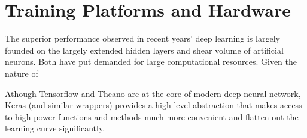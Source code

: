 \section{Training Platforms and Hardware}
The superior performance observed in recent years' deep learning is largely founded on the largely extended hidden layers and shear volume of artificial neurons. Both have put demanded for large computational resources. Given the nature of

Athough Tensorflow and Theano are at the core of modern deep neural network, Keras (and similar wrappers) provides a high level abstraction that makes access to high power functions and methods much more convenient and flatten out the learning curve significantly.  